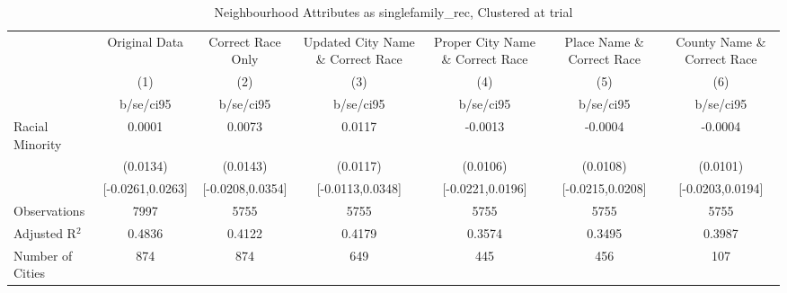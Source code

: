 \documentclass{article}
\begin{document}
\begin{table}[htbp]\centering
\def\sym#1{\ifmmode^{#1}\else\(^{#1}\)\fi}
\caption{Neighbourhood Attributes as singlefamily\_rec, Clustered at trial}
\begin{tabular}{l*{6}{c}}
\toprule
                    &\multicolumn{1}{c}{Original Data}&\multicolumn{1}{c}{Correct Race Only}&\multicolumn{1}{c}{Updated City Name \& Correct Race}&\multicolumn{1}{c}{Proper City Name \& Correct Race}&\multicolumn{1}{c}{Place Name \& Correct Race}&\multicolumn{1}{c}{County Name \& Correct Race}\\\cmidrule(lr){2-2}\cmidrule(lr){3-3}\cmidrule(lr){4-4}\cmidrule(lr){5-5}\cmidrule(lr){6-6}\cmidrule(lr){7-7}
                    &\multicolumn{1}{c}{(1)}   &\multicolumn{1}{c}{(2)}   &\multicolumn{1}{c}{(3)}   &\multicolumn{1}{c}{(4)}   &\multicolumn{1}{c}{(5)}   &\multicolumn{1}{c}{(6)}   \\
                    &   b/se/ci95   &   b/se/ci95   &   b/se/ci95   &   b/se/ci95   &   b/se/ci95   &   b/se/ci95   \\
\midrule
Racial Minority     &      0.0001   &      0.0073   &      0.0117   &     -0.0013   &     -0.0004   &     -0.0004   \\
                    &    (0.0134)   &    (0.0143)   &    (0.0117)   &    (0.0106)   &    (0.0108)   &    (0.0101)   \\
                    &[-0.0261,0.0263]   &[-0.0208,0.0354]   &[-0.0113,0.0348]   &[-0.0221,0.0196]   &[-0.0215,0.0208]   &[-0.0203,0.0194]   \\
\midrule
Observations        &        7997   &        5755   &        5755   &        5755   &        5755   &        5755   \\
Adjusted R$^2$      &      0.4836   &      0.4122   &      0.4179   &      0.3574   &      0.3495   &      0.3987   \\
Number of Cities    &         874   &         874   &         649   &         445   &         456   &         107   \\
\bottomrule
\end{tabular}
\end{table}
\end{document}
